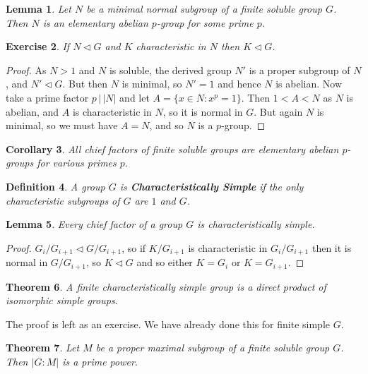\documentclass[a4paper,10pt]{article}
\newtheorem{thm}{Theorem}
\newtheorem{Def}[thm]{Definition}
\newtheorem{Cor}[thm]{Corollary}
\newtheorem{Ex}[thm]{Exercise}
\newtheorem{Lem}[thm]{Lemma}
\begin{document}
\begin{Lem}
Let $N$ be a minimal normal subgroup of a finite soluble group $G$. Then $N$ is an elementary abelian $p$-group for some prime $p$.
\end{Lem}

\begin{Ex}
If $N \triangleleft G$ and $K$ characteristic in $N$ then $K \triangleleft G$.
\end{Ex}

\begin{proof}
As $N > 1$ and $N$ is soluble, the derived group $N'$ is a proper subgroup of $N$, and $N' \triangleleft G$. But then $N$ is minimal, so $N' = 1$ and hence $N$ is abelian. Now take a prime factor $p \, \big|  \, |N|$ and let $A = \{ x \in N : x^p = 1 \}$. Then $1 < A < N$ as $N$ is abelian, and $A$ is characteristic in $N$, so it is normal in $G$. But again $N$ is minimal, so we must have $A = N$, and so $N$ is a $p$-group. 
\end{proof}


\begin{Cor}
All chief factors of finite soluble groups are elementary abelian $p$-groups for various primes $p$. 
\end{Cor}

\begin{Def}
A group $G$ is \textbf{Characteristically Simple} if the only characteristic subgroups of $G$ are $1$ and $G$.
\end{Def}

\begin{Lem}
Every chief factor of a group $G$ is characteristically simple.
\end{Lem}

\begin{proof}
$G_i / G_{i+1} \triangleleft G / G_{i+1}$, so if $K / G_{i+1}$ is characteristic in $G_i / G_{i+1}$ then it is normal in $G / G_{i+1}$, so $K \triangleleft G$ and so either $K = G_i$ or $K = G_{i+1}$. 
\end{proof}

\begin{thm}
A finite characteristically simple group is a direct product of isomorphic simple groups.
\end{thm}
The proof is left as an exercise. We have already done this for finite simple $G$.  


\begin{thm}
Let $M$ be a proper maximal subgroup of a finite soluble group $G$.  Then $|G:M|$ is a prime power.
\end{thm}
\end{document}
